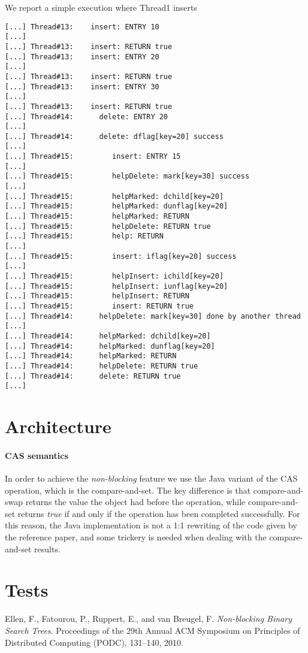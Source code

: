 \documentclass[a4paper,draft,12pt]{article}
\begin{document}
We report a simple execution where Thread1 inserts
\begin{verbatim}
[...] Thread#13:    insert: ENTRY 10
[...]
[...] Thread#13:    insert: RETURN true
[...] Thread#13:    insert: ENTRY 20
[...]
[...] Thread#13:    insert: RETURN true
[...] Thread#13:    insert: ENTRY 30
[...]
[...] Thread#13:    insert: RETURN true
[...] Thread#14:      delete: ENTRY 20
[...]
[...] Thread#14:      delete: dflag[key=20] success
[...]
[...] Thread#15:         insert: ENTRY 15
[...]
[...] Thread#15:         helpDelete: mark[key=30] success
[...]
[...] Thread#15:         helpMarked: dchild[key=20]
[...] Thread#15:         helpMarked: dunflag[key=20]
[...] Thread#15:         helpMarked: RETURN
[...] Thread#15:         helpDelete: RETURN true
[...] Thread#15:         help: RETURN
[...]
[...] Thread#15:         insert: iflag[key=20] success
[...]
[...] Thread#15:         helpInsert: ichild[key=20]
[...] Thread#15:         helpInsert: iunflag[key=20]
[...] Thread#15:         helpInsert: RETURN
[...] Thread#15:         insert: RETURN true
[...] Thread#14:      helpDelete: mark[key=30] done by another thread
[...]
[...] Thread#14:      helpMarked: dchild[key=20]
[...] Thread#14:      helpMarked: dunflag[key=20]
[...] Thread#14:      helpMarked: RETURN
[...] Thread#14:      helpDelete: RETURN true
[...] Thread#14:      delete: RETURN true
[...]
\end{verbatim}




\section{Architecture} %
\label{sec:architecture}

\paragraph{CAS semantics}
In order to achieve the \emph{non-blocking} feature we use the Java variant of the \ac{CAS} operation, which is the compare-and-set. The key difference is that compare-and-swap returns the value the object had before the operation, while compare-and-set returns \emph{true} if and only if the operation has been completed successfully. For this reason, the Java implementation is not a 1:1 rewriting of the code given by the reference paper, and some trickery is needed when dealing with the compare-and-set results.

\section{Tests} %
\label{sec:tests}



\begin{thebibliography}{9}
     Ellen, F., Fatourou, P., Ruppert, E., and van Breugel, F. \emph{Non-blocking Binary Search Trees}. Proceedings of the 29th Annual ACM Symposium on Principles of Distributed Computing (PODC), 131–140, 2010.
\end{thebibliography}
\end{document}
